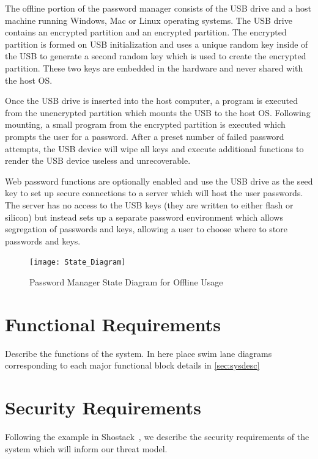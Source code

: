 \documentclass{tufte-book}
\newcommand{\pat}[1]{{\textcolor{red}{Pat: #1}}}
\begin{document}
The offline portion of the password manager consists of the USB drive and a host machine running Windows, Mac or Linux operating systems. The USB drive contains an encrypted partition and an encrypted partition.  The encrypted partition is formed on USB initialization and uses a unique random key inside of the USB to generate a second random key which is used to create the encrypted partition. These two keys are embedded in the hardware and never shared with the host OS.
\par Once the USB drive is inserted into the host computer, a program is executed from the unencrypted partition which mounts the USB to the host OS.  Following mounting, a small program from the encrypted partition is executed which prompts the user for a password. After a preset number of failed password attempts, the USB device will wipe all keys and execute additional functions to render the USB device useless and unrecoverable.\sidenote{\pat{the sidenote command can be used to highlight a finding or concept}}
\par Web password functions are optionally enabled and use the USB drive as the seed key to set up secure connections to a server which will host the user passwords.  The server has no access to the USB keys (they are written to either flash or silicon) but instead sets up a separate password environment which allows segregation of passwords and keys, allowing a user to choose where to store passwords and keys.

\begin{figure}[h]
    \centering
    \texttt{[image: State\_Diagram]}
    \caption{Password Manager State Diagram for Offline Usage}
    \label{fig:state_diagram}
\end{figure}

\section{Functional Requirements}
\label{sec:funcreq}
Describe the functions of the system.  In here place swim lane diagrams corresponding to each major functional block details in \ref{sec:sysdesc}

\section{Security Requirements}
\label{sec:secreqs}
Following the example in Shostack~\cite{shostackbook}, we describe the security requirements of the system which will inform our threat model.
\end{document}
